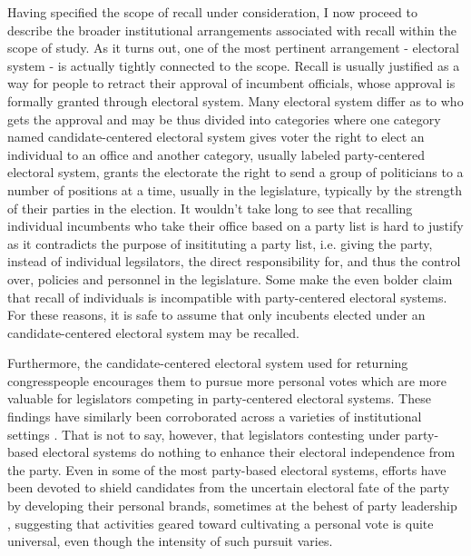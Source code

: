 \documentclass[hyphens, crop=false]{standalone}
\begin{document}
		
		Having specified the scope of recall under consideration,
		I now proceed to describe the broader institutional arrangements associated with recall within the scope of study.
		As it turns out,
		one of
		the most pertinent arrangement
		- electoral system -
		is actually tightly connected to the scope.
		Recall is usually justified as a way for people to retract their approval of incumbent officials,
		whose approval is formally granted through electoral system.
		Many electoral system differ as to who gets the approval
		and
		may be thus divided into categories where
		one category named candidate-centered electoral system gives voter the right to elect an individual to an office
		and
		another category, usually labeled party-centered electoral system, grants the electorate the right to send a group of politicians to
		a number of positions at a time, usually in the legislature,
		typically by the strength of their parties in the election.
		It wouldn't take long to see that recalling individual incumbents who take their office based on a party list is hard to justify
		as it contradicts the purpose of insitituting a party list, i.e. giving the party,
		instead of individual legsilators,
		the direct responsibility for, and thus the control over, policies and personnel in the legislature.
		Some make the even bolder claim that recall of individuals is incompatible with party-centered electoral systems.
		For these reasons, it is safe to assume that only incubents elected under an candidate-centered electoral system may be recalled.
	
		Furthermore,
		the candidate-centered electoral system used for returning congresspeople encourages them to pursue more personal votes which are more valuable for legislators competing in party-centered electoral systems.
		These findings have similarly been corroborated across a varieties of institutional settings
		\autocite{careyIncentivesCultivatePersonal1995}.
		That is not to say,
		however,
		that legislators contesting under party-based electoral systems do nothing to enhance their electoral independence from the party.
		Even in some of the most party-based electoral systems,
		efforts have been devoted to shield candidates from the uncertain electoral fate of the party by developing their personal brands,
		sometimes at the behest of party leadership
		\autocite{shugartLookingLocalsVoter2005},
		suggesting that activities geared toward cultivating a personal vote is quite universal,
		even though the intensity of such pursuit varies.
		
		
		
	
	
\end{document}
